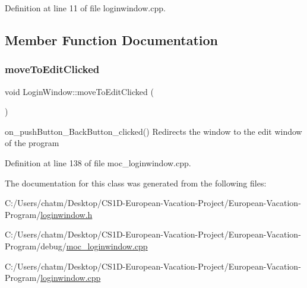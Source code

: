 Definition at line 11 of file loginwindow.\+cpp.



\subsection{Member Function Documentation}
\mbox{\label{class_login_window_a0ed797ae07a4afea038499d6929047a1}} 
\subsubsection{\texorpdfstring{moveToEditClicked}{moveToEditClicked}}
{\footnotesize\ttfamily void Login\+Window\+::move\+To\+Edit\+Clicked (\begin{DoxyParamCaption}{ }\end{DoxyParamCaption})\hspace{0.3cm}{\ttfamily [signal]}}



on\+\_\+push\+Button\+\_\+\+Back\+Button\+\_\+clicked() Redirects the window to the edit window of the program 



Definition at line 138 of file moc\+\_\+loginwindow.\+cpp.



The documentation for this class was generated from the following files\+:\begin{DoxyCompactItemize}
\item 
C\+:/\+Users/chatm/\+Desktop/\+C\+S1\+D-\/\+European-\/\+Vacation-\/\+Project/\+European-\/\+Vacation-\/\+Program/\mbox{\hyperlink{loginwindow_8h}{loginwindow.\+h}}\item 
C\+:/\+Users/chatm/\+Desktop/\+C\+S1\+D-\/\+European-\/\+Vacation-\/\+Project/\+European-\/\+Vacation-\/\+Program/debug/\mbox{\hyperlink{moc__loginwindow_8cpp}{moc\+\_\+loginwindow.\+cpp}}\item 
C\+:/\+Users/chatm/\+Desktop/\+C\+S1\+D-\/\+European-\/\+Vacation-\/\+Project/\+European-\/\+Vacation-\/\+Program/\mbox{\hyperlink{loginwindow_8cpp}{loginwindow.\+cpp}}\end{DoxyCompactItemize}
